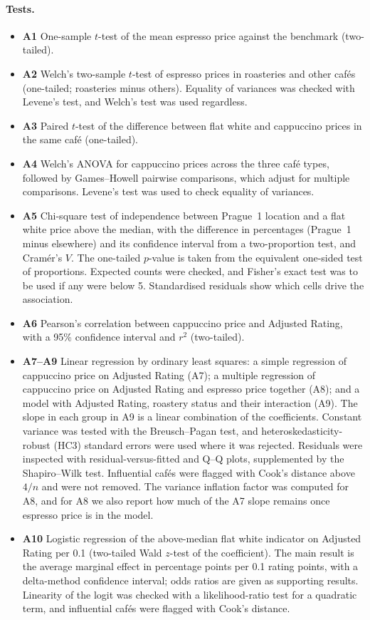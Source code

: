 \documentclass[11pt,a4paper]{article}
\begin{document}
\paragraph{Tests.}
\begin{itemize}
  \item \textbf{A1} One-sample $t$-test of the mean espresso price against the benchmark (two-tailed).
  \item \textbf{A2} Welch's two-sample $t$-test of espresso prices in roasteries and other caf\'es (one-tailed; roasteries minus others). Equality of variances was checked with Levene's test, and Welch's test was used regardless.
  \item \textbf{A3} Paired $t$-test of the difference between flat white and cappuccino prices in the same caf\'e (one-tailed).
  \item \textbf{A4} Welch's ANOVA for cappuccino prices across the three caf\'e types, followed by Games--Howell pairwise comparisons, which adjust for multiple comparisons. Levene's test was used to check equality of variances.
  \item \textbf{A5} Chi-square test of independence between Prague~1 location and a flat white price above the median, with the difference in percentages (Prague~1 minus elsewhere) and its confidence interval from a two-proportion test, and Cram\'er's $V$. The one-tailed $p$-value is taken from the equivalent one-sided test of proportions. Expected counts were checked, and Fisher's exact test was to be used if any were below 5. Standardised residuals show which cells drive the association.
  \item \textbf{A6} Pearson's correlation between cappuccino price and Adjusted Rating, with a 95\% confidence interval and $r^2$ (two-tailed).
  \item \textbf{A7--A9} Linear regression by ordinary least squares: a simple regression of cappuccino price on Adjusted Rating (A7); a multiple regression of cappuccino price on Adjusted Rating and espresso price together (A8); and a model with Adjusted Rating, roastery status and their interaction (A9). The slope in each group in A9 is a linear combination of the coefficients. Constant variance was tested with the Breusch--Pagan test, and heteroskedasticity-robust (HC3) standard errors were used where it was rejected. Residuals were inspected with residual-versus-fitted and Q--Q plots, supplemented by the Shapiro--Wilk test. Influential caf\'es were flagged with Cook's distance above $4/n$ and were not removed. The variance inflation factor was computed for A8, and for A8 we also report how much of the A7 slope remains once espresso price is in the model.
  \item \textbf{A10} Logistic regression of the above-median flat white indicator on Adjusted Rating per 0.1 (two-tailed Wald $z$-test of the coefficient). The main result is the average marginal effect in percentage points per 0.1 rating points, with a delta-method confidence interval; odds ratios are given as supporting results. Linearity of the logit was checked with a likelihood-ratio test for a quadratic term, and influential caf\'es were flagged with Cook's distance.
\end{itemize}
\end{document}

